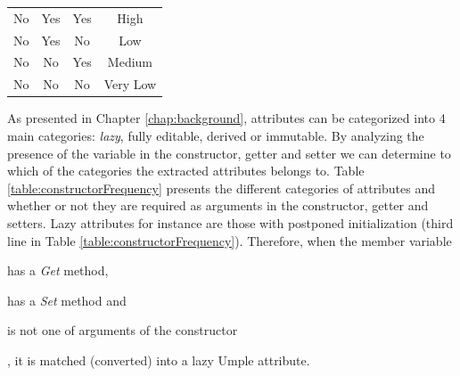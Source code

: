 \begin{table}[h]
\begin{tabular}{@{}cccc@{}}
No                                                      & Yes                                                & Yes                                                & High                                                                                                          \\
No                                                      & Yes                                                & No                                                 & Low                                                                                                           \\
No                                                      & No                                                 & Yes                                                & Medium                                                                                                        \\
No                                                      & No                                                 & No                                                 & Very Low                                                                                                      \\ \bottomrule
\end{tabular}
\end{table}

As presented in Chapter \ref{chap:background}, attributes can be categorized into 4 main categories: \textit{lazy}, fully editable, derived or immutable. By analyzing the presence of the variable in the constructor, getter and setter we can determine to which of the categories the extracted attributes belongs to. Table \ref{table:constructorFrequency} presents the different categories of attributes and whether or not they are required as arguments in the constructor, getter and setters. Lazy attributes for instance are those with postponed initialization (third line in Table \ref{table:constructorFrequency}). Therefore, when the member variable 
\begin{enumerate*}
  \item has a \textit{Get} method,
  \item has a \textit{Set} method and
  \item is not one of arguments of the constructor 
\end{enumerate*}, it is matched (converted) into a lazy Umple attribute. 

